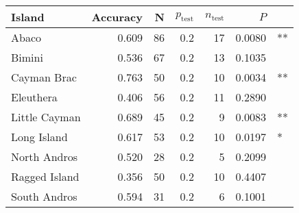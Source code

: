 
\begin{tabular}{lrrrrrl}
\toprule
Island & Accuracy & N & $p_{\mbox{test}}$ & $n_{\mbox{test}}$ & $P$ & \\
\midrule
Abaco & 0.609 & 86 & 0.2 & 17 & 0.0080 & **\\
Bimini & 0.536 & 67 & 0.2 & 13 & 0.1035 & \\
Cayman Brac & 0.763 & 50 & 0.2 & 10 & 0.0034 & **\\
Eleuthera & 0.406 & 56 & 0.2 & 11 & 0.2890 & \\
Little Cayman & 0.689 & 45 & 0.2 & 9 & 0.0083 & **\\
Long Island & 0.617 & 53 & 0.2 & 10 & 0.0197 & *\\
North Andros & 0.520 & 28 & 0.2 & 5 & 0.2099 & \\
Ragged Island & 0.356 & 50 & 0.2 & 10 & 0.4407 & \\
South Andros & 0.594 & 31 & 0.2 & 6 & 0.1001 & \\
\bottomrule
\end{tabular}
